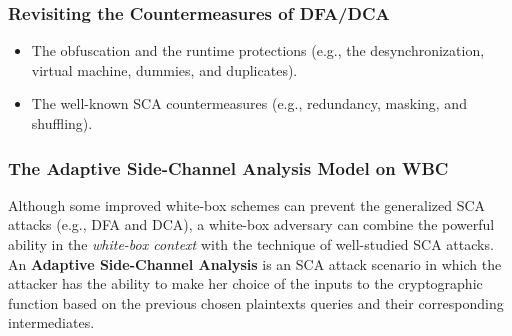 \documentclass{beamer}
\begin{document}

\frame
{
	\frametitle{Revisiting the Countermeasures of DFA/DCA }
	\begin{itemize}
		\item The obfuscation and the runtime protections (e.g., the desynchronization, virtual machine, dummies, and duplicates).
		\item The well-known SCA countermeasures (e.g., redundancy, masking, and shuffling).
	\end{itemize}
}

\frame
{
	\frametitle{The Adaptive Side-Channel Analysis Model on WBC}
	Although some improved white-box schemes can prevent the generalized SCA attacks (e.g., DFA and DCA), a white-box adversary can combine the powerful ability in the \textit{white-box context} with the technique of well-studied SCA attacks.
	\\[2ex]
	An \textbf{Adaptive Side-Channel Analysis} is an SCA attack scenario in which the attacker has the ability
	to make her choice of the inputs to the cryptographic
	function based on the previous chosen plaintexts queries and their corresponding intermediates.
}


\end{document}
